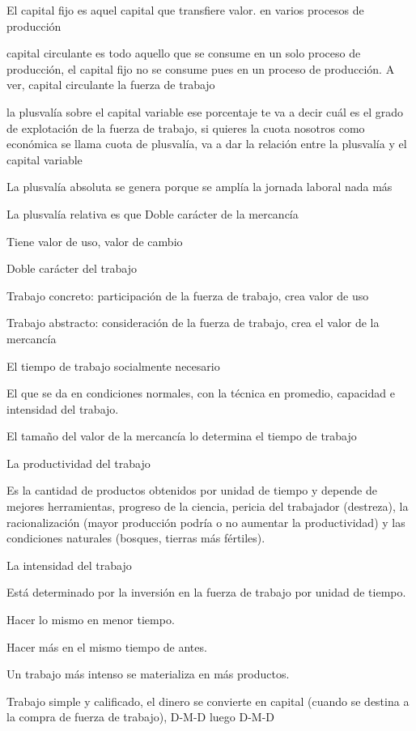 \documentclass[
  letterpaper,
  DIV=11,
  numbers=noendperiod]{scrartcl}
\begin{document}
El capital fijo es aquel capital que transfiere valor. en varios
procesos de producción

capital circulante es todo aquello que se consume en un solo proceso de
producción, el capital fijo no se consume pues en un proceso de
producción. A ver, capital circulante la fuerza de trabajo

la plusvalía sobre el capital variable ese porcentaje te va a decir cuál
es el grado de explotación de la fuerza de trabajo, si quieres la cuota
nosotros como económica se llama cuota de plusvalía, va a dar la
relación entre la plusvalía y el capital variable

La plusvalía absoluta se genera porque se amplía la jornada laboral nada
más

La plusvalía relativa es que Doble carácter de la mercancía

Tiene valor de uso, valor de cambio

Doble carácter del trabajo

Trabajo concreto: participación de la fuerza de trabajo, crea valor de
uso

Trabajo abstracto: consideración de la fuerza de trabajo, crea el valor
de la mercancía

El tiempo de trabajo socialmente necesario

El que se da en condiciones normales, con la técnica en promedio,
capacidad e intensidad del trabajo.

El tamaño del valor de la mercancía lo determina el tiempo de trabajo

La productividad del trabajo

Es la cantidad de productos obtenidos por unidad de tiempo y depende de
mejores herramientas, progreso de la ciencia, pericia del trabajador
(destreza), la racionalización (mayor producción podría o no aumentar la
productividad) y las condiciones naturales (bosques, tierras más
fértiles).

La intensidad del trabajo

Está determinado por la inversión en la fuerza de trabajo por unidad de
tiempo.

Hacer lo mismo en menor tiempo.

Hacer más en el mismo tiempo de antes.

Un trabajo más intenso se materializa en más productos.

Trabajo simple y calificado, el dinero se convierte en capital (cuando
se destina a la compra de fuerza de trabajo), D-M-D luego D-M-D
\end{document}
